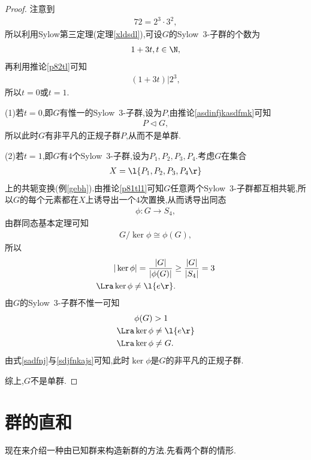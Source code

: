 \begin{proof}
    注意到\begin{align*}
        72=2^3\cdot3^2,
    \end{align*}所以利用Sylow第三定理(定理\ref{xldsdl}),可设$G$的Sylow\ $3$-子群的个数为\begin{align*}
        1+3t,t\in\N,
    \end{align*}再利用推论\ref{p82tl}可知\begin{align*}
        (1+3t)|2^3,
    \end{align*}所以$t=0$或$t=1$.

    (1)若$t=0$,即$G$有惟一的Sylow\ $3$-子群,设为$P$,由推论\ref{asdinfjkasdfmk}可知\begin{align*}
        P\lhd G,
    \end{align*}所以此时$G$有非平凡的正规子群$P$,从而不是单群.

    (2)若$t=1$,即$G$有$4$个Sylow\ $3$-子群,设为$P_1,P_2,P_3,P_4$.考虑$G$在集合\begin{align*}
        X=\l\{P_1,P_2,P_3,P_4\r\}
    \end{align*}上的共轭变换(例\ref{gebh}).由推论\ref{p81tl1}可知$G$任意两个Sylow\ $3$-子群都互相共轭,所以$G$的每个元素都在$X$上诱导出一个$4$次置换,从而诱导出同态\begin{align*}
        \phi:G\to S_4,
    \end{align*}由群同态基本定理可知\begin{align*}
        G/\ker\phi\cong\phi(G),
    \end{align*}所以\begin{align}
        &|\ker\phi|=\frac{|G|}{|\phi(G)|}\geq\frac{|G|}{|S_4|}=3\nonumber\\
        \Lra&\ker\phi\neq\l\{e\r\}.\label{sadfnj}
    \end{align}由$G$的Sylow\ $3$-子群不惟一可知\begin{align}
        &\phi(G)>1\nonumber\\
        \Lra&\ker\phi\neq\l\{e\r\}\nonumber\\
        \Lra&\ker\phi\neq G.\label{sdjfnkajs}
    \end{align}由式\eqref{sadfnj}与\eqref{sdjfnkajs}可知,此时$\ker\phi$是$G$的非平凡的正规子群.

    综上,$G$不是单群.
\end{proof}
\section{群的直和}
现在来介绍一种由已知群来构造新群的方法.先看两个群的情形.

